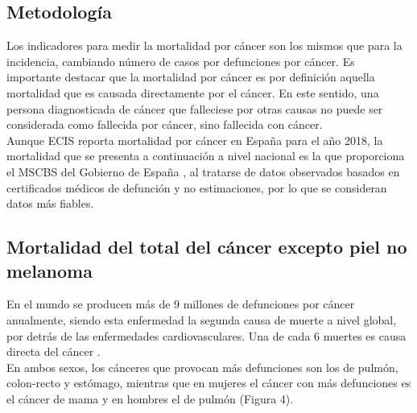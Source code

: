 \subsection{Metodología}

Los indicadores para medir la mortalidad por cáncer son los mismos que para la incidencia, cambiando número de casos por defunciones por cáncer. Es importante destacar que la mortalidad por cáncer es por definición aquella mortalidad que es causada directamente por el cáncer. En este sentido, una persona diagnosticada de cáncer que falleciese por otras causas no puede ser considerada como fallecida por cáncer, sino fallecida con cáncer.\\

Aunque ECIS \cite{ECIS} reporta mortalidad por cáncer en España para el año 2018, la mortalidad que se presenta a continuación a nivel nacional es la que proporciona el MSCBS del Gobierno de España \cite{MSCBS}, al tratarse de datos observados basados en certificados médicos de defunción y no estimaciones, por lo que se consideran datos más fiables.
 
\subsection{Mortalidad del total del cáncer excepto piel no melanoma}

En el mundo se producen más de 9 millones de defunciones por cáncer anualmente, siendo esta enfermedad la segunda causa de muerte a nivel global, por detrás de las enfermedades cardiovasculares. Una de cada 6 muertes es causa directa del cáncer \cite{WorldHealthOrganization2018}.\\

En ambos sexos, los cánceres que provocan más defunciones son los de pulmón, colon-recto y estómago, mientras que en mujeres el cáncer con más defunciones es el cáncer de mama y en hombres el de pulmón (Figura 4).\\

